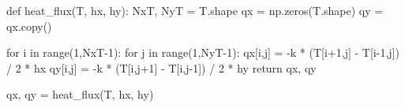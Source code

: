 \documentclass[
  letterpaper,
  DIV=11,
  numbers=noendperiod]{scrreprt}
\newenvironment{Shaded}{\begin{snugshade}}{\end{snugshade}}
\newcommand{\BuiltInTok}[1]{\textcolor[rgb]{0.00,0.23,0.31}{#1}}
\newcommand{\ControlFlowTok}[1]{\textcolor[rgb]{0.00,0.23,0.31}{#1}}
\newcommand{\DecValTok}[1]{\textcolor[rgb]{0.68,0.00,0.00}{#1}}
\newcommand{\KeywordTok}[1]{\textcolor[rgb]{0.00,0.23,0.31}{#1}}
\newcommand{\NormalTok}[1]{\textcolor[rgb]{0.00,0.23,0.31}{#1}}
\newcommand{\OperatorTok}[1]{\textcolor[rgb]{0.37,0.37,0.37}{#1}}
\begin{document}
\begin{Shaded}
\begin{Highlighting}[]
\KeywordTok{def}\NormalTok{ heat\_flux(T, hx, hy):}
\NormalTok{    NxT, NyT }\OperatorTok{=}\NormalTok{ T.shape}
\NormalTok{    qx }\OperatorTok{=}\NormalTok{ np.zeros(T.shape)}
\NormalTok{    qy }\OperatorTok{=}\NormalTok{ qx.copy()}

    \ControlFlowTok{for}\NormalTok{ i }\KeywordTok{in} \BuiltInTok{range}\NormalTok{(}\DecValTok{1}\NormalTok{,NxT}\OperatorTok{{-}}\DecValTok{1}\NormalTok{):}
        \ControlFlowTok{for}\NormalTok{ j }\KeywordTok{in} \BuiltInTok{range}\NormalTok{(}\DecValTok{1}\NormalTok{,NyT}\OperatorTok{{-}}\DecValTok{1}\NormalTok{):}
\NormalTok{            qx[i,j] }\OperatorTok{=} \OperatorTok{{-}}\NormalTok{k }\OperatorTok{*}\NormalTok{ (T[i}\OperatorTok{+}\DecValTok{1}\NormalTok{,j] }\OperatorTok{{-}}\NormalTok{ T[i}\OperatorTok{{-}}\DecValTok{1}\NormalTok{,j]) }\OperatorTok{/} \DecValTok{2} \OperatorTok{*}\NormalTok{ hx}
\NormalTok{            qy[i,j] }\OperatorTok{=} \OperatorTok{{-}}\NormalTok{k }\OperatorTok{*}\NormalTok{ (T[i,j}\OperatorTok{+}\DecValTok{1}\NormalTok{] }\OperatorTok{{-}}\NormalTok{ T[i,j}\OperatorTok{{-}}\DecValTok{1}\NormalTok{]) }\OperatorTok{/} \DecValTok{2} \OperatorTok{*}\NormalTok{ hy}
    \ControlFlowTok{return}\NormalTok{ qx, qy}
\end{Highlighting}
\end{Shaded}

\begin{Shaded}
\begin{Highlighting}[]
\NormalTok{qx, qy }\OperatorTok{=}\NormalTok{ heat\_flux(T, hx, hy)}
\end{Highlighting}
\end{Shaded}
\end{document}
